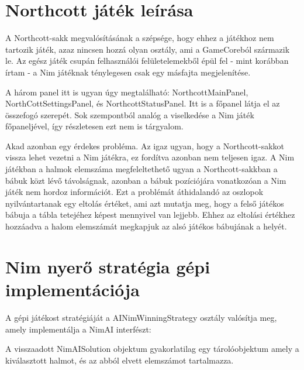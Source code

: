 \section{Northcott játék leírása}
A Northcott-sakk megvalósításának a szépsége, hogy ehhez a játékhoz nem tartozik játék, azaz nincsen hozzá olyan osztály, ami a GameCoreból származik le. Az egész játék csupán felhasználói felületelemekből épül fel - mint korábban írtam - a Nim játéknak ténylegesen csak egy másfajta megjelenítése.\ujsor

A három panel itt is ugyan úgy megtalálható: NorthcottMainPanel, NorthCottSettingsPanel, és NorthcottStatusPanel. Itt is a főpanel látja el az összefogó szerepét. Sok szempontból analóg a viselkedése a Nim játék főpaneljével, így részletesen ezt nem is tárgyalom.\ujsor

Akad azonban egy érdekes probléma. Az igaz ugyan, hogy a Northcott-sakkot vissza lehet vezetni a Nim játékra, ez fordítva azonban nem teljesen igaz. A Nim játékban a halmok elemszáma megfeleltethető ugyan a Northcott-sakkban a bábuk közt lévő távolságnak, azonban a bábuk pozíciójára vonatkozóan a Nim játék nem hordoz információt. Ezt a problémát áthidalandó az oszlopok nyilvántartanak egy eltolás értéket, ami azt mutatja meg, hogy a felső játékos bábuja a tábla tetejéhez képest mennyivel van lejjebb. Ehhez az eltolási értékhez hozzáadva a halom elemszámát megkapjuk az alsó játékos bábujának a helyét.

\section{Nim nyerő stratégia gépi implementációja} \label{section:nim_impl_winning_strategy}
A gépi játékost stratégiáját a AINimWinningStrategy osztály valósítja meg, amely implementálja a NimAI interfészt:


A visszaadott NimAISolution objektum gyakorlatilag egy tárolóobjektum amely a kiválasztott halmot, és az abból elvett elemszámot tartalmazza.

